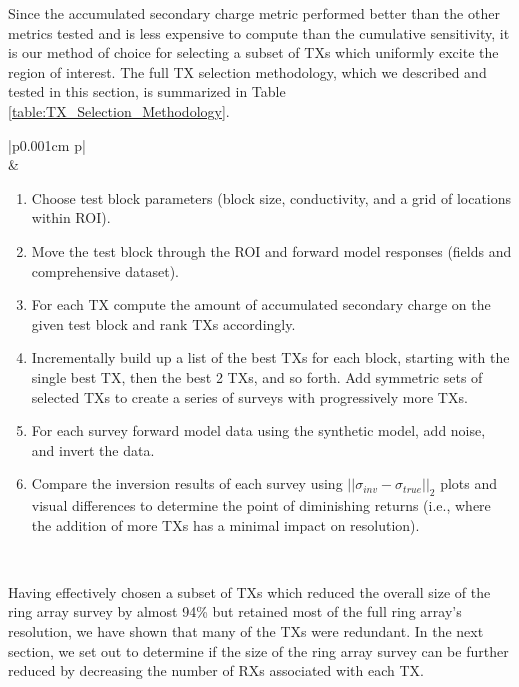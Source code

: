 \documentclass[preprint,authoryear,12pt]{elsarticle}
\begin{document}
Since the accumulated secondary charge metric performed better than the other metrics tested and is less expensive to compute than the cumulative sensitivity, it is our method of choice for selecting a subset of TXs which uniformly excite the region of interest. The full TX selection methodology, which we described and tested in this section, is summarized in Table \ref{table:TX_Selection_Methodology}.


\begin{table}
   \scriptsize
   \begin{tabular} {|p{0.001cm} p{\linewidth}|}
      \hline
       \\
       &
         \begin{enumerate}[leftmargin=*]
            \item Choose test block parameters (block size, conductivity, and a grid of locations within ROI).
            \item Move the test block through the ROI and forward model responses (fields and comprehensive dataset).
            \item For each TX compute the amount of accumulated secondary charge on the given test block and rank TXs accordingly.
            \item Incrementally build up a list of the best TXs for each block, starting with the single best TX, then the best 2 TXs, and so forth. Add symmetric sets of selected TXs to create a series of surveys with progressively more TXs.
            \item For each survey forward model data using the synthetic model, add noise, and invert the data.
            \item Compare the inversion results of each survey using $\left|| \sigma_{inv} - \sigma_{true} \right||_2$ plots and visual differences to determine the point of diminishing returns (i.e.,  where the addition of more TXs has a minimal impact on resolution).
         \end{enumerate} \\
      \hline
   \end{tabular}
   \caption{Workflow summarizing the steps in the TX selection methodology.}
   \label{table:TX_Selection_Methodology}
\end{table}


Having effectively chosen a subset of TXs which reduced the overall size of the ring array survey by almost 94\% but retained most of the full ring array's resolution, we have shown that many of the TXs were redundant. In the next section, we set out to determine if the size of the ring array survey can be further reduced by decreasing the number of RXs associated with each TX.
\end{document}
